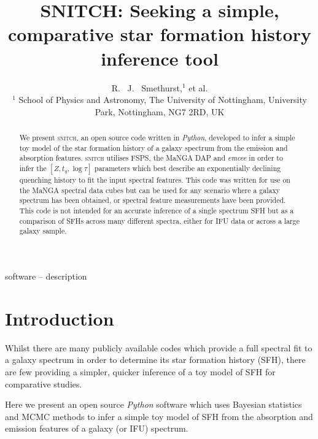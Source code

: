 \documentclass[useAMS,usenatbib]{mn2e}
\begin{document}
\title[\textsc{snitch}: inferring quenching histories]{SNITCH: Seeking a simple, comparative star formation history inference tool}
\author[Smethurst et al. 2018]{R. ~J. ~Smethurst,$^{1}$  et al.
\\ $^1$ School of Physics and Astronomy, The University of Nottingham, University Park, Nottingham, NG7 2RD, UK
}

\maketitle

\begin{abstract}
We present \textsc{snitch}, an open source code written in \emph{Python}, developed to infer a simple toy model of the star formation history of a galaxy spectrum from the emission and absorption features. \textsc{snitch} utilises FSPS, the MaNGA DAP and \emph{emcee} in order to infer the $[Z, t_q, \log \tau]$ parameters which best  describe an exponentially declining quenching history to fit the input spectral features. This code was written for use on the MaNGA spectral data cubes but can be used for any scenario where a galaxy spectrum has been obtained, or spectral feature measurements have been provided. This code is not intended for an accurate inference of a single spectrum SFH but as a comparison of SFHs across many different spectra, either for IFU data or across a large galaxy sample.
\end{abstract}

\begin{keywords}
software -- description
\end{keywords}

\section{Introduction}

Whilst there are many publicly available codes which provide a full spectral fit to a galaxy spectrum in order to determine its star formation history (SFH), there are few providing a simpler, quicker inference of a toy model of SFH for comparative studies. 

Here we present an open source \emph{Python} software which uses Bayesian statistics and MCMC methods to infer a simple toy model of SFH from the absorption and emission features of a galaxy (or IFU) spectrum. 
\end{document}
